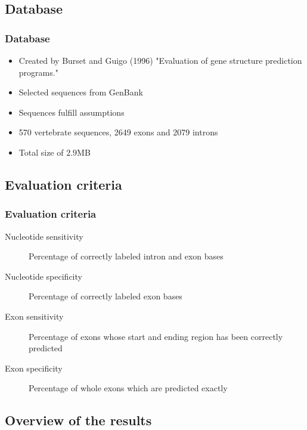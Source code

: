 \documentclass{beamer}[12pt]
\begin{document}
\subsection{Database}
\begin{frame}
	\frametitle{Database}
	\begin{itemize}
		\item Created by Burset and Guigo (1996) "Evaluation of gene structure prediction programs."
		\item Selected sequences from GenBank
		\item Sequences fulfill assumptions
		\item 570 vertebrate sequences, 2649 exons and 2079 introns
		\item Total size of $2.9$MB
	\end{itemize}
\end{frame}

\subsection{Evaluation criteria}
\begin{frame}
\frametitle{Evaluation criteria}
	\begin{description}
		\item[Nucleotide sensitivity] Percentage of correctly labeled intron and exon bases
		\item[Nucleotide specificity] Percentage of correctly labeled exon bases
		\item[Exon sensitivity] Percentage of exons whose start and ending region has been correctly predicted
		\item[Exon specificity] Percentage of whole exons which are predicted exactly
	\end{description}
\end{frame}

\subsection{Overview of the results}
\end{document}
